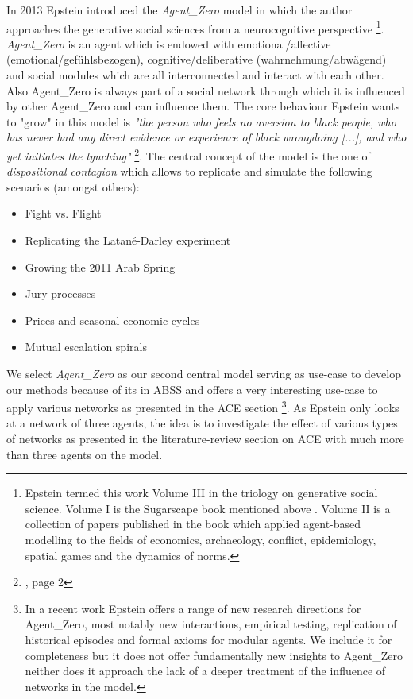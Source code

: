 In 2013 Epstein introduced the \textit{Agent\_Zero} model \cite{epstein_agent_zero:_2014} in which the author approaches the generative social sciences from a neurocognitive perspective \footnote{Epstein termed this work Volume III in the triology on generative social science. Volume I is the Sugarscape book mentioned above \cite{epstein_growing_1996}. Volume II is a collection of papers published in the book \cite{epstein_generative_2012} which applied agent-based modelling to the fields of economics, archaeology, conflict, epidemiology, spatial games and the dynamics of norms.}.
\textit{Agent\_Zero} is an agent which is endowed with emotional/affective (emotional/gefühlsbezogen), cognitive/deliberative (wahrnehmung/abwägend) and social modules which are all interconnected and interact with each other. Also Agent\_Zero is always part of a social network through which it is influenced by other Agent\_Zero and can influence them. The core behaviour Epstein wants to "grow" in this model is \textit{"the person who feels no aversion to black people, who has never had any direct evidence or experience of black wrongdoing [...], and who yet initiates the lynching"} \footnote{\cite{epstein_agent_zero:_2014}, page 2}. The central concept of the model is the one of \textit{dispositional contagion} which allows to replicate and simulate the following scenarios (amongst others):

\begin{itemize}
	\item Fight vs. Flight
	\item Replicating the Latané-Darley experiment
	\item Growing the 2011 Arab Spring
	\item Jury processes
	\item Prices and seasonal economic cycles
	\item Mutual escalation spirals
\end{itemize}

We select \textit{Agent\_Zero} as our second central model serving as use-case to develop our methods because of its in ABSS and offers a very interesting use-case to apply various networks as presented in the ACE section \footnote{In a recent work \cite{epstein_advancing_2016} Epstein offers a range of new research directions for Agent\_Zero, most notably new interactions, empirical testing, replication of historical episodes and formal axioms for modular agents. We include it for completeness but it does not offer fundamentally new insights to Agent\_Zero neither does it approach the lack of a deeper treatment of the influence of networks in the model.}. As Epstein only looks at a network of three agents, the idea is to investigate the effect of various types of networks as presented in the literature-review section on ACE with much more than three agents on the model.